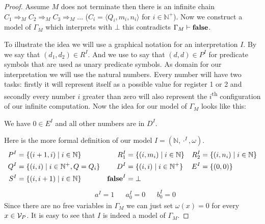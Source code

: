\begin{proof}
	Assume $M$ does not terminate then there is an infinite chain $C_1\Rightarrow_M C_2\Rightarrow_M C_3\Rightarrow_M\dots$ ($C_i=\langle Q_i,m_i,n_i\rangle$ for $i\in\mathbb{N}^+$). Now we construct a model of $\Gamma_M$ which interprets \false{} with $\bot$ this contradicts $\Gamma_M\vdash\textbf{false}$.
	
	To illustrate the idea we will use a graphical notation for an interpretation $I$.
	By
	we say that $(d_1,d_2)\in R^I$. And we use
	to say that $(d,d)\in P^I$ for predicate symbols that are used as unary predicate symbols. 
	As domain for our interpretation we will use the natural numbers. Every number will have two tasks: firstly it will represent itself as a possible value for register 1 or 2 and secondly every number $i$ greater than zero will also represent the $i$\textsuperscript{th} configuration of our infinite computation.
	Now the idea for our model of $\Gamma_M$ looks like this:
	
	\begin{figure}[H]
		\centering
		
	\end{figure}
	We have $0\in E^I$ and all other numbers are in $D^I$.
	
	Here is the more formal definition of our model $I=(\mathbb{N},\cdot^I,\omega)$.
	\begin{align*}
		  P^I&=\{(i+1,i)\mid i\in\mathbb{N}\}              & R_1^I&=\{(i,m_i)\mid i\in\mathbb{N}\} & R_2^I&=\{(i,n_i)\mid i\in\mathbb{N}\} \\
		  Q^I&=\{(i,i)\mid i\in\mathbb{N}^+, Q=Q_i\} &  D^I&=\{(i,i)\mid i\in\mathbb{N}^+\}         & E^I&=\{(0,0)\}                            \\
		  S^I&=\{(i,i+1)\mid i\in\mathbb{N}\} & \textbf{false}^I&=\bot
	\end{align*}
	\begin{align*}
		  & a^I=1 &   & a_0^I=0 &   & b_0^I=0 
	\end{align*}
	Since there are no free variables in $\Gamma_M$ we can just set $\omega(x)=0$ for every $x\in\mathcal{V}_P$. It is easy to see that $I$ is indeed a model of $\Gamma_M$.
\end{proof}
